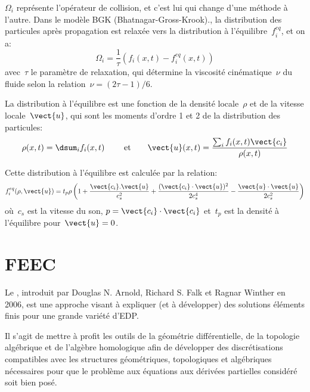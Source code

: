 $\Omega_i$ représente l'opérateur de collision, et c'est lui qui change d'une méthode à l'autre.
Dans le modèle BGK (Bhatnagar-Gross-Krook).,
la distribution des particules après propagation est relaxée vers la distribution à l'équilibre~$f_i^{eq}$,
et on a:
\begin{equation} \Omega_i = \frac1{\tau}\left(f_i(x,t)-f_i^{eq}(x,t)\right) \end{equation}
avec~$\tau$ le paramètre de relaxation, qui détermine la viscosité cinématique~$\nu$ du
fluide selon la relation~$\nu=(2\tau -1)/6$.

La distribution à l'équilibre est une fonction de la densité locale~$\rho$ et de la vitesse locale~$\vect{u}$,
qui sont les moments d'ordre 1 et 2 de la distribution des particules:
\begin{equation} \rho(x,t) = \dsum_i f_i(x,t) \qquad\text{ et}\qquad \vect{u}(x,t)=\dfrac{\sum_i f_i(x,t)\vect{c_i}}{\rho(x,t)} \end{equation}

Cette distribution à l'équilibre est calculée par la relation:
\begin{equation} f_i^{eq}(\rho,\vect{u}) = t_p \rho \left(1+\dfrac{\vect{c_i}.\vect{u}}{c_s^2} + 
\dfrac{(\vect{c_i}\cdot\vect{u})^2}{2c_s^4} - \dfrac{\vect{u}\cdot\vect{u}}{2c_s^2}\right) \end{equation}
où~$c_s$ est la vitesse du son, $p=\vect{c_i}\cdot\vect{c_i}$ et~$t_p$ est la densité à l'équilibre
pour~$\vect{u}=0$.






\medskip{}
\section{FEEC}

Le , introduit par Douglas N. Arnold, 
Richard S. Falk et Ragnar Winther 
en 2006, est une approche visant à expliquer (et à développer) 
des solutions éléments finis pour une grande variété d'EDP.

Il s'agit de mettre à profit les outils de la géométrie différentielle, de la topologie 
algébrique et de l'algèbre homologique afin de développer des discrétisations compatibles 
avec les structures géométriques, topologiques et algébriques nécessaires pour que le
problème aux équations aux dérivées partielles considéré soit bien posé.

